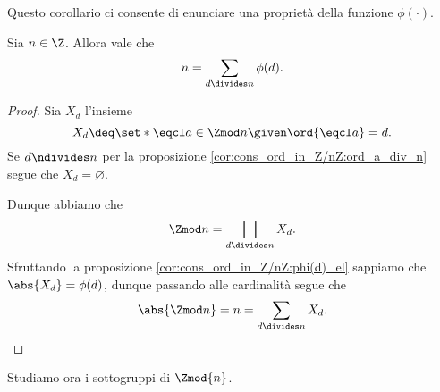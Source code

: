 Questo corollario ci consente di enunciare una proprietà della funzione $\phi(\cdot)$.

\begin{corollary}
    Sia $n \in \Z$. Allora vale che \[
        n = \sum_{d \divides n} \phi(d).    
    \]
\end{corollary}
\begin{proof}
    Sia $X_d$ l'insieme \[
        X_d \deq \set*{\eqcl a \in \Zmod n \given \ord{\eqcl a} = d}.    
    \]
    Se $d \ndivides n$ per la proposizione \ref{cor:cons_ord_in_Z/nZ:ord_a_div_n} segue che $X_d = \varnothing$.

    Dunque abbiamo che \[
        \Zmod n = \bigsqcup_{d \divides n} X_d.  
    \] Sfruttando la proposizione \ref{cor:cons_ord_in_Z/nZ:phi(d)_el} sappiamo che $\abs{X_d} = \phi(d)$, dunque passando alle cardinalità segue che \[
        \abs{\Zmod n} = n = \sum_{d \divides n} X_d.    
    \]
\end{proof}

Studiamo ora i sottogruppi di $\Zmod{n}$.


